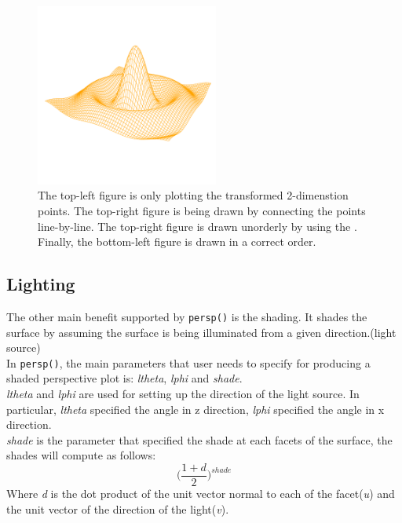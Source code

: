 \documentclass[paper=a4, fontsize=11pt]{report}
\begin{document}
\begin{figure}[h]
\begin{center}
  \includegraphics[height = 6cm, width = 6cm]{figure/standalone_p_4.pdf}
  \caption{The top-left figure is only plotting the transformed 2-dimenstion points. The top-right figure is being drawn by connecting the points line-by-line. The top-right figure is drawn unorderly by using the . Finally, the bottom-left figure is drawn in a correct order.}
  	\label{figure4}
\end{center}
\end{figure}

\subsection{Lighting}
The other main benefit supported by \texttt{persp()} is the shading. It shades the surface by assuming the surface is being illuminated from a given direction.(light source)\\

In \texttt{persp()}, the main parameters that user needs to specify for producing a shaded perspective plot is: \textit{ltheta}, \textit{lphi} and \textit{shade}.\\

\textit{ltheta} and \textit{lphi} are used for setting up the direction of the light source. In particular, \textit{ltheta} specified the angle in z direction, \textit{lphi} specified the angle in x direction. \\

\textit{shade} is the parameter that specified the shade at each facets of the surface, the shades will compute as follows:
\begin{equation}
\big(\frac{1 + d}{2}\big)^{shade}
\end{equation}
Where \textit{d} is the dot product of the unit vector normal to each of the facet(\textit{u}) and the unit vector of the direction of the light(\textit{v}). \\
\end{document}
